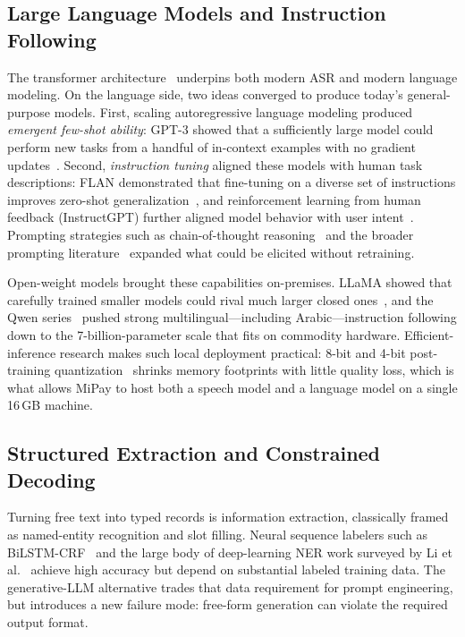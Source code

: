 \subsection{Large Language Models and Instruction Following}

The transformer architecture~\cite{vaswani2017attention} underpins both modern
ASR and modern language modeling. On the language side, two ideas converged to
produce today's general-purpose models. First, scaling autoregressive language
modeling produced \emph{emergent few-shot ability}: GPT-3 showed that a
sufficiently large model could perform new tasks from a handful of in-context
examples with no gradient updates~\cite{brown2020gpt3,radford2019gpt2}. Second,
\emph{instruction tuning} aligned these models with human task descriptions:
FLAN demonstrated that fine-tuning on a diverse set of instructions improves
zero-shot generalization~\cite{wei2022flan}, and reinforcement learning from
human feedback (InstructGPT) further aligned model behavior with user
intent~\cite{ouyang2022instructgpt}. Prompting strategies such as chain-of-thought
reasoning~\cite{wei2022cot} and the broader prompting
literature~\cite{liu2023promptsurvey} expanded what could be elicited without
retraining.

Open-weight models brought these capabilities on-premises. LLaMA showed that
carefully trained smaller models could rival much larger closed
ones~\cite{touvron2023llama}, and the Qwen series~\cite{yang2024qwen2,qwen2024qwen25}
pushed strong multilingual---including Arabic---instruction following down to the
7-billion-parameter scale that fits on commodity hardware. Efficient-inference
research makes such local deployment practical: 8-bit and 4-bit post-training
quantization~\cite{dettmers2022llmint8,frantar2023gptq} shrinks memory footprints
with little quality loss, which is what allows MiPay to host both a speech model
and a language model on a single 16\,GB machine.

\subsection{Structured Extraction and Constrained Decoding}

Turning free text into typed records is information extraction, classically
framed as named-entity recognition and slot filling. Neural sequence labelers
such as BiLSTM-CRF~\cite{lample2016ner} and the large body of deep-learning NER
work surveyed by Li et al.~\cite{li2022ner} achieve high accuracy but depend on
substantial labeled training data. The generative-LLM alternative trades that
data requirement for prompt engineering, but introduces a new failure mode:
free-form generation can violate the required output format.

